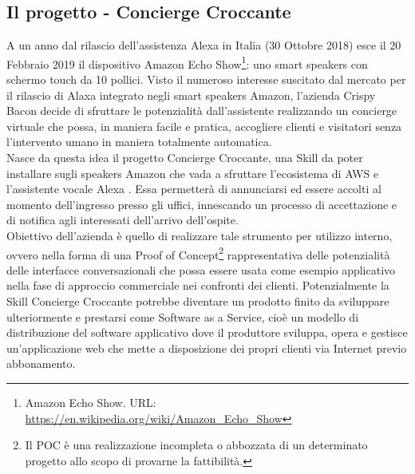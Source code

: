 \subsection{Il progetto - Concierge Croccante}
A un anno dal rilascio dell'assistenza Alexa in Italia (30 Ottobre 2018) esce il 20 Febbraio 2019 il dispositivo Amazon Echo Show\footnote{Amazon Echo Show. URL: \href{https://en.wikipedia.org/wiki/Amazon\_Echo\_Show}{https://en.wikipedia.org/wiki/Amazon\_Echo\_Show}}: uno smart speakers con schermo touch da 10 pollici. Visto il numeroso interesse suscitato dal mercato per il rilascio di Alaxa integrato negli smart speakers Amazon, l'azienda Crispy Bacon decide di sfruttare le potenzialità dall'assistente realizzando un concierge virtuale che possa, in maniera facile e pratica, accogliere clienti e visitatori senza l'intervento umano in maniera totalmente automatica.\\ Nasce da questa idea il progetto Concierge Croccante, una Skill da poter installare sugli speakers Amazon che vada a sfruttare l'ecosistema di AWS e l'assistente vocale Alexa . Essa permetterà di annunciarsi ed essere accolti al momento dell'ingresso presso gli uffici, innescando un processo di accettazione e di notifica agli interessati dell'arrivo dell'ospite.\\ Obiettivo dell'azienda è quello di realizzare tale strumento per utilizzo interno, ovvero nella forma di una Proof of Concept\footnote{Il POC è una realizzazione incompleta o abbozzata di un determinato progetto allo scopo di provarne la fattibilità.} rappresentativa delle potenzialità delle interfacce conversazionali che possa essere usata come esempio applicativo nella fase di approccio commerciale nei confronti dei clienti. Potenzialmente la Skill Concierge Croccante potrebbe diventare un prodotto finito da sviluppare ulteriormente e prestarsi come Software as a Service, cioè un modello di distribuzione del software applicativo dove il produttore sviluppa, opera e gestisce un'applicazione web che mette a disposizione dei propri clienti via Internet previo abbonamento. 

